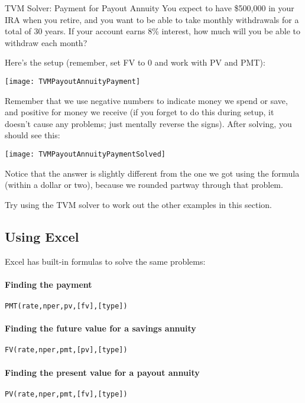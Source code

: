 \begin{example}[https://www.youtube.com/watch?v=QF27dvKPIJ8&list=PLfmpjsIzhztsZtnb7HnXrQ8SLoiOCIcAM&index=33]{TVM Solver: Payment for Payout Annuity}
You expect to have \$500,000 in your IRA when you retire, and you want to be able to take monthly withdrawals for a total of 30 years.  If your account earns 8\% interest, how much will you be able to withdraw each month?

\sol
Here's the setup (remember, set FV to 0 and work with PV and PMT):
\begin{center}
\texttt{[image: TVMPayoutAnnuityPayment]}
\end{center}
Remember that we use negative numbers to indicate money we spend or save, and positive for money we receive (if you forget to do this during setup, it doesn't cause any problems; just mentally reverse the signs).  After solving, you should see this:
\begin{center}
\texttt{[image: TVMPayoutAnnuityPaymentSolved]}
\end{center}
Notice that the answer is slightly different from the one we got using the formula (within a dollar or two), because we rounded partway through that problem.
\end{example}

\begin{try}
Try using the TVM solver to work out the other examples in this section.
\end{try}
\vfill
\pagebreak

\subsection{Using Excel}
Excel has built-in formulas to solve the same problems:
\paragraph{Finding the payment} \texttt{PMT(rate,nper,pv,[fv],[type])}
\paragraph{Finding the future value for a savings annuity} \texttt{FV(rate,nper,pmt,[pv],[type])}
\paragraph{Finding the present value for a payout annuity} \texttt{PV(rate,nper,pmt,[fv],[type])}

